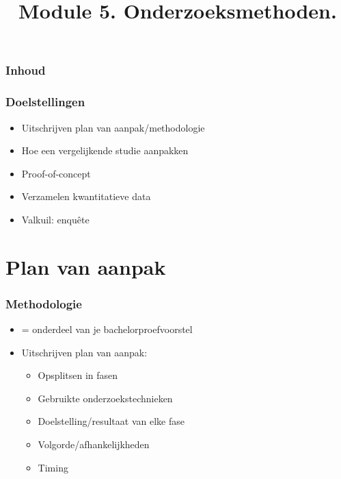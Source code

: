 \documentclass[aspectratio=169]{beamer}
\title{Module 5. Onderzoeksmethoden.}
\subtitle{\coursename}
\author{\lecturers}   %
\date{\academicyear}
\begin{document}
\begin{frame}
  \maketitle
\end{frame}

\begin{frame}
  \frametitle{Inhoud}

  \tableofcontents
\end{frame}

\begin{frame}
  \frametitle{Doelstellingen}

  \begin{itemize}
    \item Uitschrijven plan van aanpak/methodologie
    \item Hoe een vergelijkende studie aanpakken
    \item Proof-of-concept
    \item Verzamelen kwantitatieve data
    \item Valkuil: enquête
  \end{itemize}

\end{frame}

\section{Plan van aanpak}

\begin{frame}
  \frametitle{Methodologie}

  \begin{itemize}
    \item = onderdeel van je bachelorproefvoorstel
    \item Uitschrijven plan van aanpak:
    \begin{itemize}
      \item Opsplitsen in fasen
      \item Gebruikte onderzoekstechnieken
      \item Doelstelling/resultaat van elke fase
      \item Volgorde/afhankelijkheden
      \item Timing
    \end{itemize}
  \end{itemize}


\end{frame}
\end{document}
